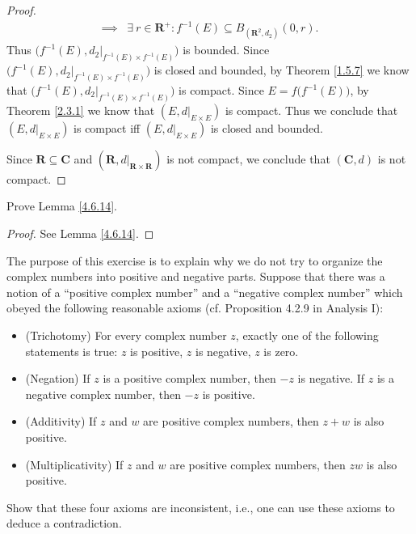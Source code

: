 \begin{proof}
\begin{align*}
        \implies & \exists\ r \in \mathbf{R}^+ : f^{-1}(E) \subseteq B_{(\mathbf{R}^2, d_2)}(0, r).
    \end{align*}
    Thus \(\big(f^{-1}(E), d_2|_{f^{-1}(E) \times f^{-1}(E)}\big)\) is bounded.
    Since \(\big(f^{-1}(E), d_2|_{f^{-1}(E) \times f^{-1}(E)}\big)\) is closed and bounded, by Theorem \ref{1.5.7} we know that \(\big(f^{-1}(E), d_2|_{f^{-1}(E) \times f^{-1}(E)}\big)\) is compact.
    Since \(E = f\big(f^{-1}(E)\big)\), by Theorem \ref{2.3.1} we know that \((E, d|_{E \times E})\) is compact.
    Thus we conclude that \((E, d|_{E \times E})\) is compact iff \((E, d|_{E \times E})\) is closed and bounded.

    Since \(\mathbf{R} \subseteq \mathbf{C}\) and \((\mathbf{R}, d|_{\mathbf{R} \times \mathbf{R}})\) is not compact, we conclude that \((\mathbf{C}, d)\) is not compact.
\end{proof}

\begin{exercise}\label{ex 4.6.14}
    Prove Lemma \ref{4.6.14}.
\end{exercise}

\begin{proof}
    See Lemma \ref{4.6.14}.
\end{proof}

\begin{exercise}\label{ex 4.6.15}
    The purpose of this exercise is to explain why we do not try to organize the complex numbers into positive and negative parts.
    Suppose that there was a notion of a ``positive complex number'' and a ``negative complex number'' which obeyed the following reasonable axioms (cf. Proposition 4.2.9 in Analysis I):
    \begin{itemize}
        \item (Trichotomy)
              For every complex number \(z\), exactly one of the following statements is true:
              \(z\) is positive, \(z\) is negative, \(z\) is zero.
        \item (Negation)
              If \(z\) is a positive complex number, then \(-z\) is negative.
              If \(z\) is a negative complex number, then \(-z\) is positive.
        \item (Additivity)
              If \(z\) and \(w\) are positive complex numbers, then \(z + w\) is also positive.
        \item (Multiplicativity)
              If \(z\) and \(w\) are positive complex numbers, then \(zw\) is also positive.
    \end{itemize}
    Show that these four axioms are inconsistent, i.e., one can use these axioms to deduce a contradiction.
\end{exercise}

